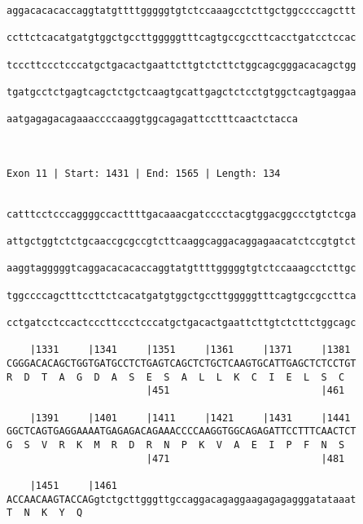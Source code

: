 \documentclass{article}
\begin{document}
\begin{Verbatim}
aggacacacaccaggtatgttttgggggtgtctccaaagcctcttgctggccccagcttt
                                                            
ccttctcacatgatgtggctgccttgggggtttcagtgccgccttcacctgatcctccac
                                                            
tcccttccctcccatgctgacactgaattcttgtctcttctggcagcgggacacagctgg
                                                            
tgatgcctctgagtcagctctgctcaagtgcattgagctctcctgtggctcagtgaggaa
                                                            
aatgagagacagaaaccccaaggtggcagagattcctttcaactctacca
                                                  
                                                  
 
Exon 11 | Start: 1431 | End: 1565 | Length: 134


catttcctcccaggggccacttttgacaaacgatcccctacgtggacggccctgtctcga
                                                            
attgctggtctctgcaaccgcgccgtcttcaaggcaggacaggagaacatctccgtgtct
                                                            
aaggtagggggtcaggacacacaccaggtatgttttgggggtgtctccaaagcctcttgc
                                                            
tggccccagctttccttctcacatgatgtggctgccttgggggtttcagtgccgccttca
                                                            
cctgatcctccactcccttccctcccatgctgacactgaattcttgtctcttctggcagc
                                                            
    |1331     |1341     |1351     |1361     |1371     |1381 
CGGGACACAGCTGGTGATGCCTCTGAGTCAGCTCTGCTCAAGTGCATTGAGCTCTCCTGT
R  D  T  A  G  D  A  S  E  S  A  L  L  K  C  I  E  L  S  C  
                        |451                          |461  
  
    |1391     |1401     |1411     |1421     |1431     |1441 
GGCTCAGTGAGGAAAATGAGAGACAGAAACCCCAAGGTGGCAGAGATTCCTTTCAACTCT
G  S  V  R  K  M  R  D  R  N  P  K  V  A  E  I  P  F  N  S  
                        |471                          |481  
  
    |1451     |1461                                         
ACCAACAAGTACCAGgtctgcttgggttgccaggacagaggaagagagagggatataaat
T  N  K  Y  Q                                               
                                                            

\end{Verbatim}
\end{document}
